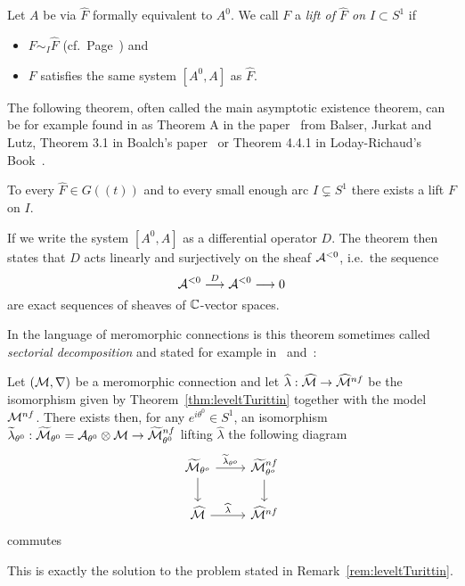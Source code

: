 \begin{defn}\label{defn:lift}
  Let $A$ be via $\hat F$ formally equivalent to $A^0$.
  We call $F$ a \emph{lift of $\hat F$ on $I\subset S^1$} if
  \begin{itemize}
    \item $F\sim_I\hat F$
      (cf.\ Page~\pageref{page:notationForAsymptoticExpansion}) and
    \item $F$ satisfies the same system $[A^0,A]$ as $\hat F$.
  \end{itemize}
\end{defn}
The following theorem, often called the main asymptotic existence theorem, can
be for example found in as Theorem A in the paper~\cite{BJL1979Birkhoff} from
Balser, Jurkat and Lutz, Theorem 3.1 in Boalch's paper~\cite{boalch}
or Theorem 4.4.1 in Loday-Richaud's Book~\cite{Loday2014}.
\begin{thm}[M.A.E.T]\label{thm:maet}
  To every $\hat F\in G(\!(t)\!)$ and to every small enough arc
  $I\subsetneq S^1$ there exists a lift $F$ on $I$.
  \begin{s-rem}
    If we write the system $[A^0,A]$ as a differential operator $D$.
    The theorem then states that $D$ acts linearly and surjectively on the
    sheaf $\mathcal{A}^{<0}$, i.e.\ the sequence
    \[
      \mathcal{A}^{<0}\overset{D}\longrightarrow\mathcal{A}^{<0} \longrightarrow 0
    \]
    are exact sequences of sheaves of $\mathbb{C}$-vector spaces.
    \begin{comment}
      (cf.~\cite[App.1;Thm.1]{malgrange1991})
    \end{comment}
  \end{s-rem}
\end{thm}
\begin{rem}
  In the language of meromorphic connections is this theorem sometimes called
  \emph{sectorial decomposition} and stated for example
  in~\cite[Thm.II.5.12]{sabbah2007isomonodromic}
  and~\cite[Sec.II.2.4]{sabbah_cimpa90}:
  \begin{s-thm}\label{thm:sectorialDecompFromMAET}
    Let $(\mathcal{M},\nabla)$ be a meromorphic connection and let
    $\widehat\lambda:\widehat{\mathcal{M}}\to\widehat{\mathcal{M}}^{nf}$ be the isomorphism given by
    Theorem~\ref{thm:leveltTurittin} together with the model $\mathcal{M}^{nf}$.
    There exists then, for any $e^{i\theta^0}\in S^1$, an isomorphism
    $\widetilde\lambda_{\theta^0}:
    \widetilde{\mathcal{M}}_{\theta^0}=\mathcal{A}_{\theta^0}\otimes\mathcal{M}\to\widetilde{\mathcal{M}}_{\theta^0}^{nf}$
    lifting $\hat\lambda$  the following diagram
    \[ \begin{tikzcd}
        \tilde\cM_{\theta^o} \dar \rar{\tilde\lambda_{\theta^o}} &
        \tilde\cM^{nf}_{\theta^o} \dar
        \\\hat\cM \rar{\hat\lambda} &
        \hat\cM^{nf}
    \end{tikzcd} \]
    commutes
  \end{s-thm}
  This is exactly the solution to the problem stated in
  Remark~\ref{rem:leveltTurittin}.
\end{rem}

